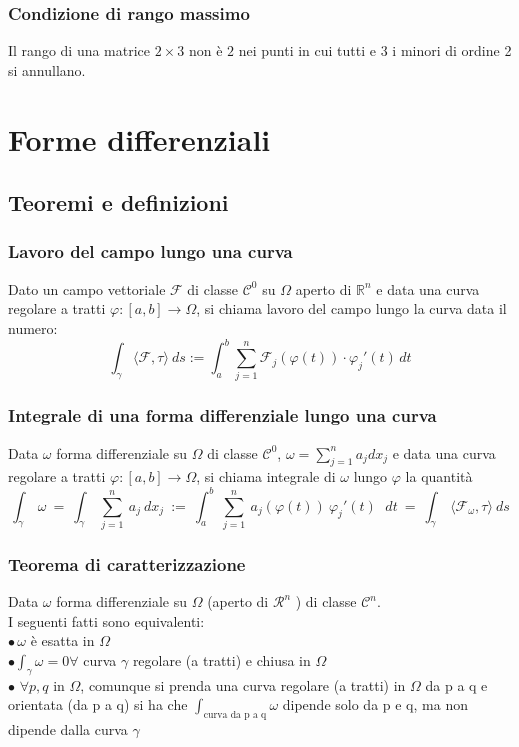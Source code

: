 \documentclass{article} %
\begin{document}
    \subsubsection*{Condizione di rango massimo}
    Il rango di una matrice $2 \times 3$ non è $2$ nei punti in cui tutti e 3 i minori di ordine 2 si annullano.
    

    \section{Forme differenziali}
    \subsection{Teoremi e definizioni}
    \subsubsection*{Lavoro del campo lungo una curva}
    Dato un campo vettoriale $\mathcal{F} $ di classe $ \mathcal{C} ^0 $ su $\Omega$ aperto di $ \mathbb{R} ^n $
    e data una curva regolare a tratti $\varphi:[a,b]\to \Omega $, si chiama lavoro del campo lungo la curva data il numero:
    $$ \int _\gamma \langle \mathcal{F} , \tau \rangle \  ds := \int_{a}^{b} \sum_{j = 1}^{n}  \mathcal{F}_j(\varphi (t)) \cdot \varphi_j ' (t) \,dt  $$

    \subsubsection*{Integrale di una forma differenziale lungo una curva}
    Data $\omega $ forma differenziale su $\Omega $ di classe $ \mathcal{C} ^0 $, $ \omega = \sum_{j = 1}^{n} a_j dx_j $
    e data una curva regolare a tratti $\varphi:[a,b]\to \Omega $, si chiama integrale di $\omega$ lungo $\varphi$ la quantità
    $$ \int _\gamma  \ \omega \ = \ \int _\gamma \ \sum_{j = 1}^{n} \ a_j \ dx_j\ :=\  \int_{a}^{b} \ \sum_{j = 1}^{n} \ a_j ( \varphi (t) ) \ \varphi_j ' (t) \,\ \ dt \ = \ \int _\gamma \ \langle \mathcal{F} _\omega , \tau \rangle \  ds  $$

    \subsubsection*{Teorema di caratterizzazione}
    Data $\omega$ forma differenziale su $\Omega$ (aperto di $\mathcal{R}^n$ ) di classe $\mathcal{C} ^n$. \\
    I seguenti fatti sono equivalenti: \\
    $\bullet \, \omega$ è esatta in $\Omega$ \\
    $\bullet \int_{\gamma} \omega = 0 \forall$ curva $\gamma$ regolare (a tratti) e chiusa in $\Omega$ \\
    $\bullet$ $\forall p,q$ in $\Omega$, comunque si prenda una curva regolare (a tratti) in $\Omega$ da p a q e orientata (da p a q) si ha che $ \int_{\text{curva da p a q}} \omega$ dipende solo da p e q, ma non dipende dalla curva $\gamma$
\end{document}
